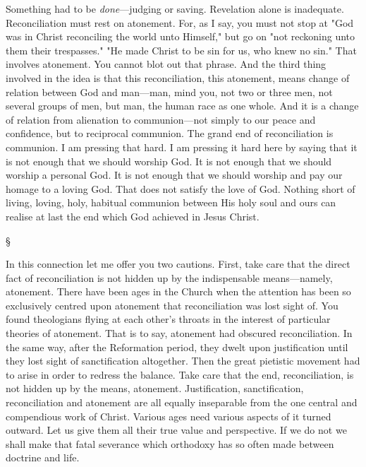 \documentclass[12pt,a5paper,twoside,titlepage]{book}
\begin{document}
Something had to be \textit{done}---judging or saving. 
Revelation alone is inadequate. Reconciliation 
must rest on atonement. For, as I say, 
you must not stop at "God was in Christ 
reconciling the world unto Himself," but go on 
"not reckoning unto them their trespasses." 
"He made Christ to be sin for us, who knew 
no sin." That involves atonement. You cannot 
blot out that phrase. And the third thing 
involved in the idea is that this reconciliation, 
this atonement, means change of relation between 
God and man---man, mind you, not two 
or three men, not several groups of men, 
but man, the human race as one whole. And it 
is a change of relation from alienation to communion---not 
simply to our peace and confidence, 
but to reciprocal communion. The grand end of 
reconciliation is communion. I am pressing 
that hard. I am pressing it hard here by 
saying that it is not enough that we should 
worship God. It is not enough that we should 
worship a personal God. It is not enough that 
we should worship and pay our homage to a 
loving God. That does not satisfy the love of 
God. Nothing short of living, loving, holy, 
habitual communion between His holy soul and 
ours can realise at last the end which God 
achieved in Jesus Christ. 

\begin{center}
\S
\end{center}

In this connection let me offer you two 
cautions. First, take care that the direct fact 
of reconciliation is not hidden up by the indispensable 
means---namely, atonement. There 
have been ages in the Church when the 
attention has been so exclusively centred upon 
atonement that reconciliation was lost sight 
of. You found theologians flying at each 
other's throats in the interest of particular 
theories of atonement. That is to say, atonement 
had obscured reconciliation. In the same 
way, after the Reformation period, they dwelt 
upon justification until they lost sight of 
sanctification altogether. Then the great 
pietistic movement had to arise in order to 
redress the balance. Take care that the end, 
reconciliation, is not hidden up by the means, 
atonement. Justification, sanctification, reconciliation 
and atonement are all equally inseparable 
from the one central and compendious 
work of Christ. Various ages need various 
aspects of it turned outward. Let us give 
them all their true value and perspective. If 
we do not we shall make that fatal severance 
which orthodoxy has so often made between 
doctrine and life. 
\end{document}

